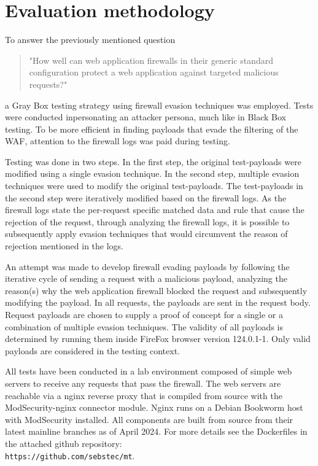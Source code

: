 \section{Evaluation methodology}
\label{sec:evaluation}
To answer the previously mentioned question
\begin{quote} "How well can web application firewalls in their generic standard configuration protect a web application against targeted malicious requests?"
\end{quote}
a Gray Box testing strategy using firewall evasion techniques was employed. Tests were conducted inpersonating an attacker persona, much like in Black Box testing.
To be more efficient in finding payloads that evade the filtering of the WAF, attention to the firewall logs was paid during testing.

Testing was done in two steps. In the first step, the original test-payloads were modified using a single evasion technique.
In the second step, multiple evasion techniques were used to modify the original test-payloads.
The test-payloads in the second step were iteratively modified based on the firewall logs.
As the firewall logs state the per-request specific matched data and rule that cause the rejection of the request, through analyzing the firewall logs, it is possible to subsequently apply evasion techniques that would circumvent the reason of rejection mentioned in the logs.

An attempt was made to develop firewall evading payloads by following the iterative cycle of sending a request with a malicious payload, analyzing the reason(s) why the web application firewall blocked the request and subsequently modifying the payload. In all requests, the payloads are sent in the request body.
Request payloads are chosen to supply a proof of concept for a single or a combination of multiple evasion techniques. The validity of all payloads is determined by running them inside FireFox browser version 124.0.1-1. Only valid payloads are considered in the testing context. %

All tests have been conducted in a lab environment composed of simple web servers to receive any requests that pass the firewall.
The web servers are reachable via a nginx reverse proxy that is compiled from source with the ModSecurity-nginx connector module. Nginx runs on a Debian Bookworm host with ModSecurity installed.
All components are built from source from their latest mainline branches as of April 2024.
For more details see the Dockerfiles in the attached github repository:\\ \verb|https://github.com/sebstec/mt|. 

